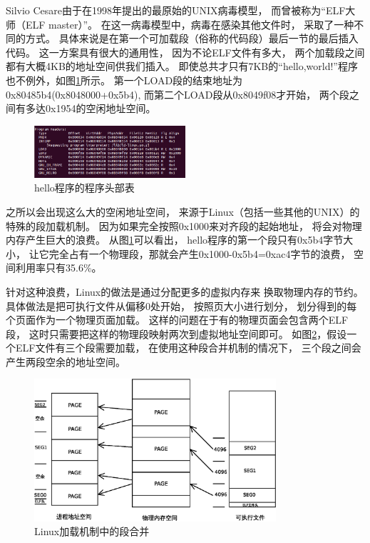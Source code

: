 Silvio Cesare由于在1998年提出的最原始的UNIX病毒模型，
而曾被称为“ELF大师（ELF master）”。
在这一病毒模型中，病毒在感染其他文件时，
采取了一种不同的方式。
具体来说是在第一个可加载段（俗称的代码段）最后一节的最后插入代码。
这一方案具有很大的通用性，
因为不论ELF文件有多大，
两个加载段之间都有大概4KB的地址空间供我们插入。
即使总共才只有7KB的“hello,world!”程序也不例外，如图\ref{hello}所示。
第一个LOAD段的结束地址为0x80485b4(0x8048000+0x5b4),
而第二个LOAD段从0x8049f08才开始，
两个段之间有多达0x1954的空闲地址空间。

\begin{figure}[h!]
  \centering
  \includegraphics[width=0.5\textwidth]{figure/helloprograms.png}
  \caption{hello程序的程序头部表}
  \label{hello}
\end{figure}

之所以会出现这么大的空闲地址空间，
来源于Linux（包括一些其他的UNIX）的特殊的段加载机制。
因为如果完全按照0x1000来对齐段的起始地址，
将会对物理内存产生巨大的浪费。
从图\ref{hello}可以看出，
hello程序的第一个段只有0x5b4字节大小，
让它完全占有一个物理段，那就会产生0x1000-0x5b4=0xac4字节的浪费，
空间利用率只有35.6\%。


针对这种浪费，Linux的做法是通过分配更多的虚拟内存来
换取物理内存的节约。
具体做法是把可执行文件从偏移0处开始，
按照页大小进行划分，
划分得到的每个页面作为一个物理页面加载。
这样的问题在于有的物理页面会包含两个ELF段，
这时只需要把这样的物理段映射两次到虚拟地址空间即可。
如图\ref{linuxmap}，假设一个ELF文件有三个段需要加载，
在使用这种段合并机制的情况下，
三个段之间会产生两段空余的地址空间。


\begin{figure}[h!]
  \centering
  \includegraphics[width=0.8\textwidth]{figure/linuxmap.eps}
  \caption{Linux加载机制中的段合并}
  \label{linuxmap}
\end{figure}



